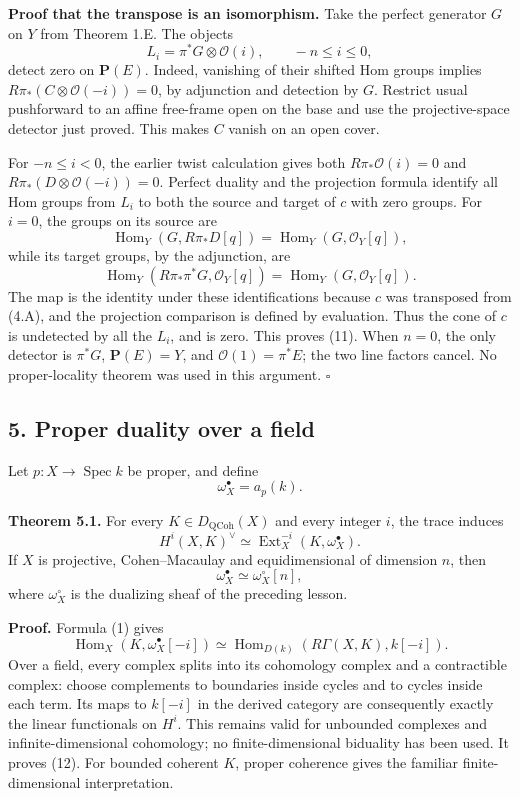\documentclass[11pt]{article}
\begin{document}
\textbf{Proof that the transpose is an isomorphism.} Take the perfect
generator \(G\) on \(Y\) from Theorem 1.E. The objects \[
L_i=\pi^*G\otimes\mathcal O(i),\qquad -n\leq i\leq0,
\] detect zero on \(\mathbf P(E)\). Indeed, vanishing of their shifted
Hom groups implies \(R\pi_*(C\otimes\mathcal O(-i))=0\), by adjunction
and detection by \(G\). Restrict usual pushforward to an affine
free-frame open on the base and use the projective-space detector just
proved. This makes \(C\) vanish on an open cover.

For \(-n\leq i<0\), the earlier twist calculation gives both
\(R\pi_*\mathcal O(i)=0\) and \(R\pi_*(D\otimes\mathcal O(-i))=0\).
Perfect duality and the projection formula identify all Hom groups from
\(L_i\) to both the source and target of \(c\) with zero groups. For
\(i=0\), the groups on its source are \[
\operatorname{Hom}_Y(G,R\pi_*D[q])
=\operatorname{Hom}_Y(G,\mathcal O_Y[q]),
\] while its target groups, by the adjunction, are \[
\operatorname{Hom}_Y(R\pi_*\pi^*G,\mathcal O_Y[q])
=\operatorname{Hom}_Y(G,\mathcal O_Y[q]).
\] The map is the identity under these identifications because \(c\) was
transposed from (4.A), and the projection comparison is defined by
evaluation. Thus the cone of \(c\) is undetected by all the \(L_i\), and
is zero. This proves (11). When \(n=0\), the only detector is
\(\pi^*G\), \(\mathbf P(E)=Y\), and \(\mathcal O(1)=\pi^*E\); the two
line factors cancel. No proper-locality theorem was used in this
argument. \(\square\)

\subsection{5. Proper duality over a
field}\label{proper-duality-over-a-field}

Let \(p:X\to\operatorname{Spec}k\) be proper, and define \[
\omega_X^\bullet=a_p(k).
\]

\textbf{Theorem 5.1.} For every \(K\in D_{\mathrm{QCoh}}(X)\) and every
integer \(i\), the trace induces \[
H^i(X,K)^\vee\simeq
\operatorname{Ext}^{-i}_X(K,\omega_X^\bullet).
\tag{12}
\] If \(X\) is projective, Cohen--Macaulay and equidimensional of
dimension \(n\), then \[
\omega_X^\bullet\simeq\omega_X^\circ[n],
\] where \(\omega_X^\circ\) is the dualizing sheaf of the preceding
lesson.

\textbf{Proof.} Formula (1) gives \[
\operatorname{Hom}_X(K,\omega_X^\bullet[-i])
 \simeq\operatorname{Hom}_{D(k)}(R\Gamma(X,K),k[-i]).
\] Over a field, every complex splits into its cohomology complex and a
contractible complex: choose complements to boundaries inside cycles and
to cycles inside each term. Its maps to \(k[-i]\) in the derived
category are consequently exactly the linear functionals on \(H^i\).
This remains valid for unbounded complexes and infinite-dimensional
cohomology; no finite-dimensional biduality has been used. It proves
(12). For bounded coherent \(K\), proper coherence gives the familiar
finite-dimensional interpretation.
\end{document}
